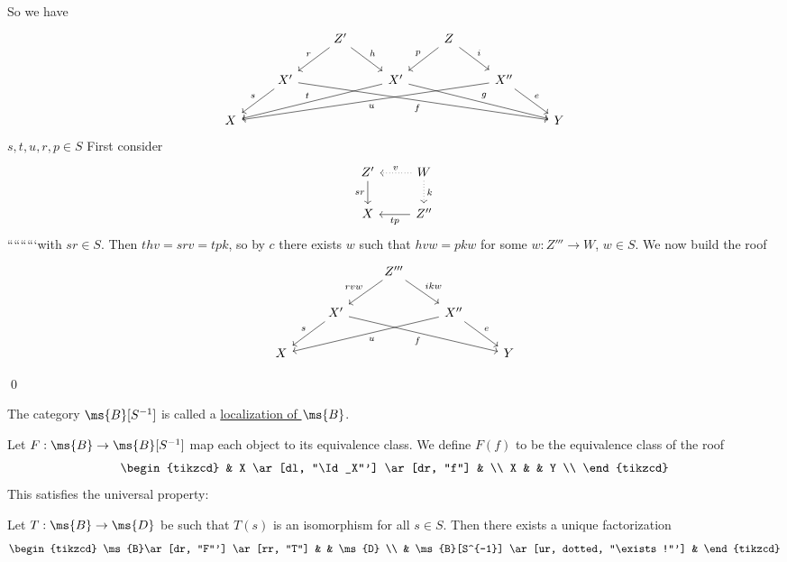 \documentclass[x11names,reqno,14pt]{extarticle}
\begin{document}
So we have
\[
\begin{tikzcd}
& & Z'\ar[dl, "r"']\ar[dr, "h"] & & Z \ar[dl, "p"'] \ar[dr, "i"]& & \\
& X' \ar[dl, "s"']\ar[drrrrr,"f"']& & \ar[dlll, "t"']X'\ar[drrr, "g"] & & X'' \ar[dr, "e"]\ar[dlllll,"u"]& \\
X & & & & & & Y
\end{tikzcd}
\]
$s, t, u, r, p \in S$
First consider
\[
\begin{tikzcd}
Z' \ar[d, "sr"'] & W \ar[l, dotted, "v"'] \ar[d, dotted, "k"] \\
X & Z'' \ar[l, "tp"]
\end{tikzcd}
\]
`````````with $sr \in S$. Then $thv = srv = tpk$, so by $c$ there exists $w$ such that $hvw = pkw$ for some $w:Z'''\to W$, $w \in S$. We now build the roof
\[
\begin{tikzcd}
& & Z''' \ar[dl, "rvw"']\ar[dr, "ikw"]& & \\
& X' \ar[dl, "s"'] \ar[drrr, "f"']& & X''\ar[dr, "e"] \ar[dlll, "u"] & \\
X & & & & Y 
\end{tikzcd}
\]

\qed


The category $\ms{B}[S^{-1}]$ is called a \underline{localization of $\ms{B}$}. 

Let $F:\ms{B}\to\ms{B}[S^{-1}]$ map each object to its equivalence class. We define $F(f)$ to be the equivalence class of the roof
\[
\begin{tikzcd}
& X \ar[dl, "\Id_X"'] \ar[dr, "f"] & \\
X & & Y \\
\end{tikzcd}
\]
This satisfies the universal property:

Let $T:\ms{B}\to\ms{D}$ be such that $T(s)$ is an isomorphism for all $s \in S$. Then there exists a unique factorization
\[
\begin{tikzcd}
\ms{B}\ar[dr, "F"'] \ar[rr, "T"] & & \ms{D} \\
& \ms{B}[S^{-1}] \ar[ur, dotted, "\exists!"'] &
\end{tikzcd}
\]
\end{document}
